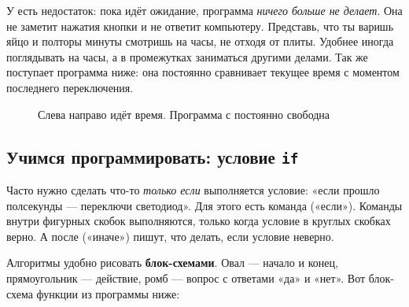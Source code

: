 У  есть недостаток: пока идёт ожидание, программа \emph{ничего больше не делает}.
Она не заметит нажатия кнопки и не ответит компьютеру. Представь, что ты варишь яйцо и полторы
минуты смотришь на часы, не отходя от плиты. Удобнее иногда поглядывать на часы, а в промежутках
заниматься другими делами. Так же поступает программа ниже: она постоянно сравнивает текущее время
 с моментом последнего переключения.

\begin{figure}[H]
\centering
{}
\caption{Слева направо идёт время. Программа с  постоянно свободна}
\end{figure}

\subsection{Учимся программировать: условие \texttt{if}}

Часто нужно сделать что-то \emph{только если} выполняется условие: «если прошло полсекунды --- переключи
светодиод». Для этого есть команда  («если»). Команды внутри фигурных скобок выполняются, только
когда условие в круглых скобках верно. А после  («иначе») пишут, что делать, если условие неверно.

Алгоритмы удобно рисовать \textbf{блок-схемами}. Овал --- начало и конец, прямоугольник --- действие,
ромб --- вопрос с ответами «да» и «нет». Вот блок-схема функции  из программы ниже:

